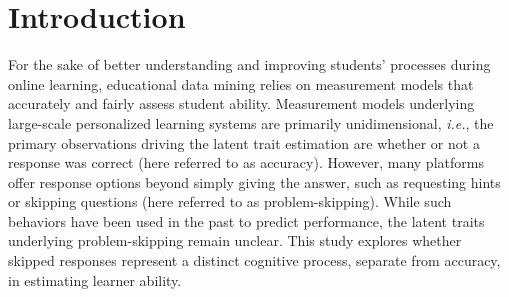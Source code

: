 \documentclass{edm_article}
\begin{document}

\section{Introduction}
For the sake of better understanding and improving students' processes during online learning, educational data mining relies on measurement models that accurately and fairly assess student ability. Measurement models underlying large-scale personalized learning systems are primarily unidimensional, \textit{i.e.}, the primary observations driving the latent trait estimation are whether or not a response was correct (here referred to as accuracy). However, many platforms offer response options beyond simply giving the answer, such as requesting hints or skipping questions (here referred to as problem-skipping). While such behaviors have been used in the past to predict performance, the latent traits underlying problem-skipping remain unclear. This study explores whether skipped responses represent a distinct cognitive process, separate from accuracy, in estimating learner ability. 
\end{document}
